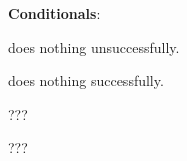 \textbf{Conditionals}:
\begin{compactenum}
\item [\symbolcoreutils]  does nothing unsuccessfully.

\item [\symbolcoreutils]  does nothing successfully.

\item [\symbolcoreutils]  \dotfill ???

\item [\symbolcoreutils]  \dotfill ???
\end{compactenum}
